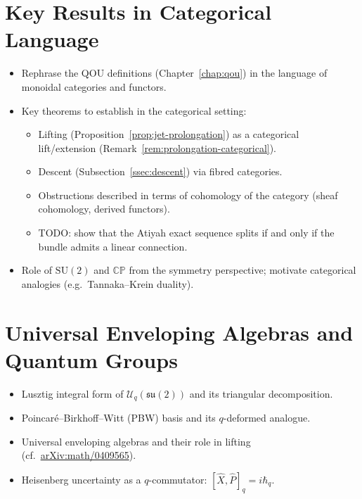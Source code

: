 \documentclass[12pt,a4paper]{report}
\begin{document}
\section{Key Results in Categorical Language}
\label{sec:categorical-reformulation}

\begin{itemize}
  \item Rephrase the QOU definitions
        (Chapter~\ref{chap:qou}) in the language of monoidal categories
        and functors.
  \item Key theorems to establish in the categorical setting:
    \begin{itemize}
      \item Lifting (Proposition~\ref{prop:jet-prolongation}) as a
            categorical lift/extension
            (Remark~\ref{rem:prolongation-categorical}).
      \item Descent (Subsection~\ref{ssec:descent}) via fibred categories.
      \item Obstructions described in terms of cohomology of the category
            (sheaf cohomology, derived functors).
      \item TODO: show that the Atiyah exact sequence splits if and only
            if the bundle admits a linear connection.
    \end{itemize}
  \item Role of $\mathrm{SU}(2)$ and $\mathbb{CP}$ from the symmetry
        perspective; motivate categorical analogies
        (e.g.\ Tannaka--Krein duality).
\end{itemize}



\section{Universal Enveloping Algebras and Quantum Groups}
\label{sec:enveloping-algebras}

\begin{itemize}
  \item Lusztig integral form of
        $\mathcal{U}_q(\mathfrak{su}(2))$ and its triangular decomposition.
  \item Poincar\'{e}--Birkhoff--Witt (PBW) basis and its
        $q$-deformed analogue.
  \item Universal enveloping algebras and their role in lifting
        (cf.\ \href{https://arxiv.org/abs/math/0409565}{arXiv:math/0409565}).
  \item Heisenberg uncertainty as a $q$-commutator:
        $[\hat{X},\hat{P}]_q = i\hbar_q$.
\end{itemize}
\end{document}
